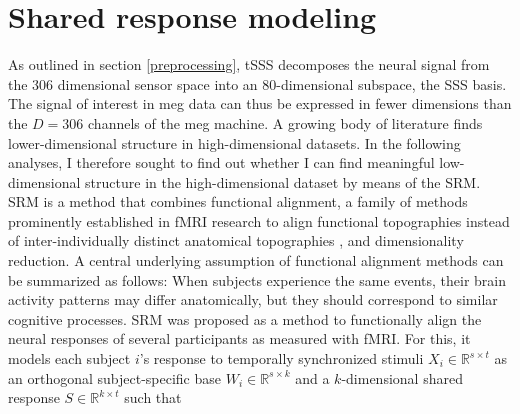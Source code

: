 

\section{Shared response modeling}



As outlined in section \ref{preprocessing}, \gls{tSSS} decomposes the neural signal from the 306 dimensional sensor space into an 80-dimensional subspace, the \gls{SSS} basis.
The signal of interest in \gls{meg} data can thus be expressed in fewer dimensions than the $D = 306$ channels of the \gls{meg} machine.
A growing body of literature finds lower-dimensional structure in high-dimensional datasets.
In the following analyses, I therefore sought to find out whether I can find meaningful low-dimensional structure in the high-dimensional dataset by means of the \gls{SRM}.
\gls{SRM} \citep{NIPS2015_b3967a0e} is a method that combines functional alignment, a family of methods prominently established in \gls{fMRI} research to align functional topographies instead of inter-individually distinct anatomical topographies \citep{haxby2011common}, and dimensionality reduction.
A central underlying assumption of functional alignment methods can be summarized as follows: When subjects experience the same events, their brain activity patterns may differ anatomically, but they should correspond to similar cognitive processes.
\gls{SRM} was proposed as a method to functionally align the neural responses of several participants as measured with \gls{fMRI}.
For this, it models each subject $i$'s response to temporally synchronized stimuli $X_i \in \mathbb{R}^{s \times t}$ as an orthogonal subject-specific base $W_i \in \mathbb{R}^{s\times k}$ and a $k$-dimensional shared response $S \in \mathbb{R}^{k \times t}$ such that


